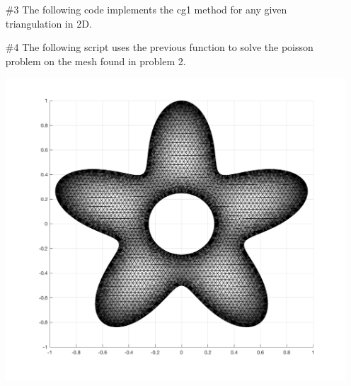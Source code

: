\documentclass[11pt, titlepage]{article}
\begin{document}
\begin{enumerate}
  \item[\#3]
    The following code implements the cg1 method for any given triangulation in 2D.
    

  \item[\#4]
    The following script uses the previous function to solve the poisson problem
    on the mesh found in problem 2.
    

    \begin{center}
      \includegraphics[scale=0.3]{Figures/02_02.png}
    \end{center}

\end{enumerate}
\end{document}
